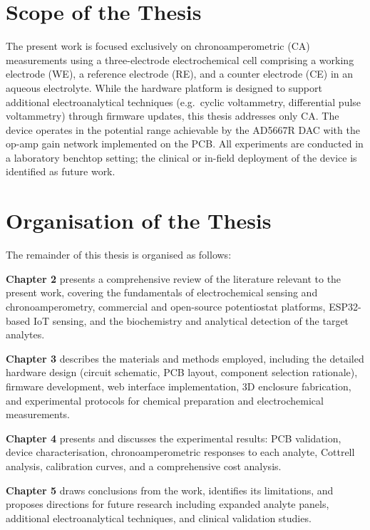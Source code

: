\section{Scope of the Thesis}
\label{sec:scope}

The present work is focused exclusively on chronoamperometric (CA) measurements using a three-electrode electrochemical cell comprising a working electrode (WE), a reference electrode (RE), and a counter electrode (CE) in an aqueous electrolyte. While the hardware platform is designed to support additional electroanalytical techniques (e.g.\ cyclic voltammetry, differential pulse voltammetry) through firmware updates, this thesis addresses only CA. The device operates in the potential range achievable by the AD5667R DAC with the op-amp gain network implemented on the PCB. All experiments are conducted in a laboratory benchtop setting; the clinical or in-field deployment of the device is identified as future work.

\section{Organisation of the Thesis}
\label{sec:organisation}

The remainder of this thesis is organised as follows:

\textbf{Chapter 2} presents a comprehensive review of the literature relevant to the present work, covering the fundamentals of electrochemical sensing and chronoamperometry, commercial and open-source potentiostat platforms, ESP32-based IoT sensing, and the biochemistry and analytical detection of the target analytes.

\textbf{Chapter 3} describes the materials and methods employed, including the detailed hardware design (circuit schematic, PCB layout, component selection rationale), firmware development, web interface implementation, 3D enclosure fabrication, and experimental protocols for chemical preparation and electrochemical measurements.

\textbf{Chapter 4} presents and discusses the experimental results: PCB validation, device characterisation, chronoamperometric responses to each analyte, Cottrell analysis, calibration curves, and a comprehensive cost analysis.

\textbf{Chapter 5} draws conclusions from the work, identifies its limitations, and proposes directions for future research including expanded analyte panels, additional electroanalytical techniques, and clinical validation studies.
